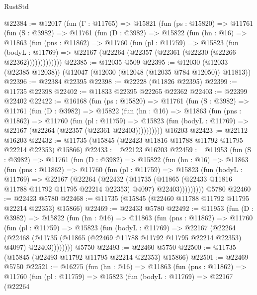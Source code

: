 \begin{lexlean}{RustStd}
\begin{coremodule}
@22384 := @12017
    (fun (Γ : @11765) =>
    @15821
      (fun (ps : @15820) =>
      @11761
        (fun (S : @3982) =>
        @11761
          (fun (D : @3982) =>
          @15822
            (fun (hn : @16) =>
            @11863
              (fun (pns : @11862) =>
              @11760
                (fun (pl : @11759) =>
                @15823
                  (fun (bodyL : @11769) =>
                  @22167 (@22264 (@22357 (@22361 (@22230 (@22266 @22362)))))))))))))
@22385 := @12035 @509
@22395 := @12030 (@12033 (@22385 @12038)) (@12047 (@12030 (@12048 (@12035 @784 @12050)) @11813))
@22396 := @22384 @22395
@22398 := @22228 (@11826 @22395)
@22399 := @11735 @22398
@22402 := @11833 @22395 @22265 @22362
@22403 := @22399 @22402
@22422 := @16168
    (fun (ps : @15820) =>
    @11761
      (fun (S : @3982) =>
      @11761
        (fun (D : @3982) =>
        @15822
          (fun (hn : @16) =>
          @11863
            (fun (pns : @11862) =>
            @11760
              (fun (pl : @11759) =>
              @15823 (fun (bodyL : @11769) => @22167 (@22264 (@22357 (@22361 @22403))))))))))
    @16203
@22423 := @22112 @16203
@22432 := @11735 (@15845 (@22423 @11816 @11788 @11792 @11795 @22214 @22353) @15866)
@22433 := @22123 @16203
@22459 := @11953
    (fun (S : @3982) =>
    @11761
      (fun (D : @3982) =>
      @15822
        (fun (hn : @16) =>
        @11863
          (fun (pns : @11862) =>
          @11760
            (fun (pl : @11759) =>
            @15823
              (fun (bodyL : @11769) =>
              @22167
                (@22264
                  (@22432
                    (@11735
                      (@11865 (@22433 @11816 @11788 @11792 @11795 @22214 @22353) @4097)
                      @22403)))))))))
    @5780
@22460 := @22423 @5780
@22468 := @11735 (@15845 (@22460 @11788 @11792 @11795 @22214 @22353) @15866)
@22469 := @22433 @5780
@22492 := @11953
    (fun (D : @3982) =>
    @15822
      (fun (hn : @16) =>
      @11863
        (fun (pns : @11862) =>
        @11760
          (fun (pl : @11759) =>
          @15823
            (fun (bodyL : @11769) =>
            @22167
              (@22264
                (@22468
                  (@11735 (@11865 (@22469 @11788 @11792 @11795 @22214 @22353) @4097) @22403))))))))
    @5750
@22493 := @22460 @5750
@22500 := @11735 (@15845 (@22493 @11792 @11795 @22214 @22353) @15866)
@22501 := @22469 @5750
@22521 := @16275
    (fun (hn : @16) =>
    @11863
      (fun (pns : @11862) =>
      @11760
        (fun (pl : @11759) =>
        @15823
          (fun (bodyL : @11769) =>
          @22167
            (@22264

\end{coremodule}
\end{lexlean}
